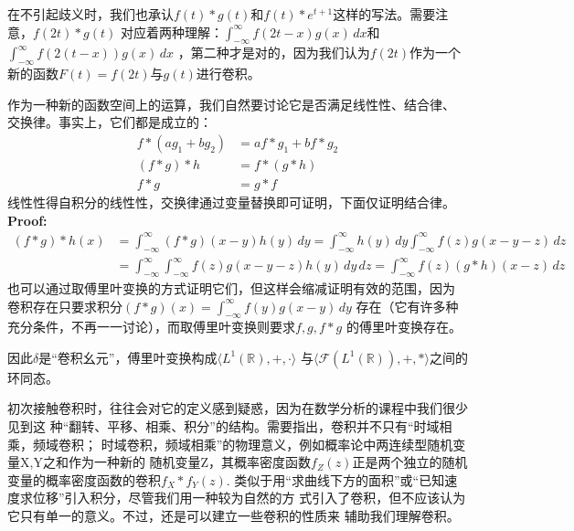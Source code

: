 \documentclass{ctexbook}
\begin{document}
在不引起歧义时，我们也承认$f(t)*g(t)$和$f(t)*e^{t+1}$这样的写法。需要注意，$f(2t)*g(t)$
对应着两种理解：$\int_{-\infty}^{\infty}f(2t-x)g(x)\,dx$和$\int_{-\infty}^{\infty}f(2(t-x))g(x)\,dx$
，第二种才是对的，因为我们认为$f(2t)$作为一个新的函数$F(t)=f(2t)$与$g(t)$进行卷积。

作为一种新的函数空间上的运算，我们自然要讨论它是否满足线性性、结合律、
交换律。事实上，它们都是成立的：
\begin{align}
    f*(ag_1+bg_2) & =af*g_1+bf*g_2 \\
    (f*g)*h       & =f*(g*h)       \\
    f*g           & =g*f
\end{align}
线性性得自积分的线性性，交换律通过变量替换即可证明，下面仅证明结合律。\\
\textbf{Proof:}
\begin{align*}
    (f*g)*h(x) & =\int_{-\infty}^{\infty}(f*g)(x-y)h(y)\,dy=\int_{-\infty}^{\infty}h(y)\,dy\int_{-\infty}^{\infty}f(z)g(x-y-z)\,dz \\
               & =\int_{-\infty}^{\infty}\int_{-\infty}^{\infty}f(z)g(x-y-z)h(y)\,dy\,dz=\int_{-\infty}^{\infty}f(z)(g*h)(x-z)\,dz
\end{align*}
也可以通过取傅里叶变换的方式证明它们，但这样会缩减证明有效的范围，因为
卷积存在只要求积分$(f*g)(x)=\int_{-\infty}^{\infty}f(y)g(x-y)\,dy$
存在（它有许多种充分条件，不再一一讨论），而取傅里叶变换则要求$f,g,f*g$
的傅里叶变换存在。

因此$\delta$是“卷积幺元”，傅里叶变换构成$\langle L^1(\mathbb{R}),+,\cdot\rangle$
与$\langle \mathcal{F} (L^1(\mathbb{R})),+,*\rangle$之间的环同态。

初次接触卷积时，往往会对它的定义感到疑惑，因为在数学分析的课程中我们很少见到这
种“翻转、平移、相乘、积分”的结构。需要指出，卷积并不只有“时域相乘，频域卷积；
时域卷积，频域相乘”的物理意义，例如概率论中两连续型随机变量X,Y之和作为一种新的
随机变量Z，其概率密度函数$f_Z(z)$正是两个独立的随机变量的概率密度函数的卷积$f_X*f_Y(z)$.
类似于用“求曲线下方的面积”或“已知速度求位移”引入积分，尽管我们用一种较为自然的方
式引入了卷积，但不应该认为它只有单一的意义。不过，还是可以建立一些卷积的性质来
辅助我们理解卷积。
\end{document}
